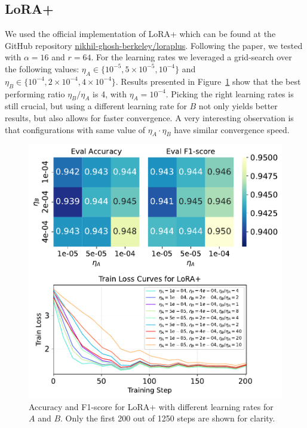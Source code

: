 \documentclass[a4paper,10pt,twocolumn,english]{article}
\begin{document}
\subsection{LoRA+}

We used the official implementation of LoRA+ which can be found at the GitHub repository \href{https://github.com/nikhil-ghosh-berkeley/loraplus}{nikhil-ghosh-berkeley/loraplus}. Following the paper, we tested with $\alpha = 16$ and $r = 64$. For the learning rates we leveraged a grid-search over the following values: $\eta_A \in \{10^{-5}, 5 \times 10^{-5}, 10^{-4}\}$ and $\eta_B \in \{10^{-4}, 2 \times 10^{-4}, 4 \times 10^{-4}\}$. Results presented in Figure~\ref{fig:lora_plus} show that the best performing ratio $\eta_B / \eta_A$ is 4, with $\eta_A = 10^{-4}$. Picking the right learning rates is still crucial, but using a different learning rate for $B$ not only yields better results, but also allows for faster convergence. A very interesting observation is that configurations with same value of $\eta_A \cdot \eta_B$ have similar convergence speed.

\begin{figure}[ht]
    \centering
    \includegraphics[width=1\linewidth]{../plots/lora_plus_train_loss_curves_final_v2.pdf}
    \caption{Accuracy and F1-score for LoRA+ with different learning rates for $A$ and $B$. Only the first 200 out of 1250 steps are shown for clarity.}
    \label{fig:lora_plus}
\end{figure}
\end{document}
